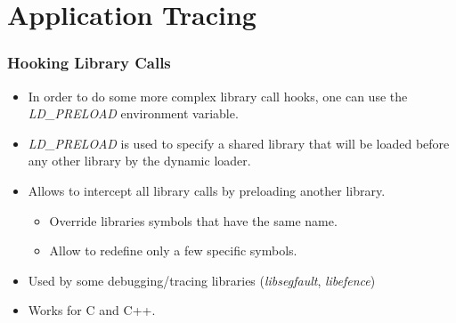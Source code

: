 \section{Application Tracing}




\begin{frame}
  \frametitle{Hooking Library Calls}
  \begin{itemize}
    \item In order to do some more complex library call hooks, one can use
          the {\em LD\_PRELOAD} environment variable.
    \item {\em LD\_PRELOAD} is used to specify a shared library that will be
          loaded before any other library by the dynamic loader.
    \item Allows to intercept all library calls by preloading another library.
    \begin{itemize}
      \item Override libraries symbols that have the same name.
      \item Allow to redefine only a few specific symbols.
    \end{itemize}
    \item Used by some debugging/tracing libraries ({\em libsegfault},
          {\em libefence})
    \item Works for C and C++.
  \end{itemize}
\end{frame}

